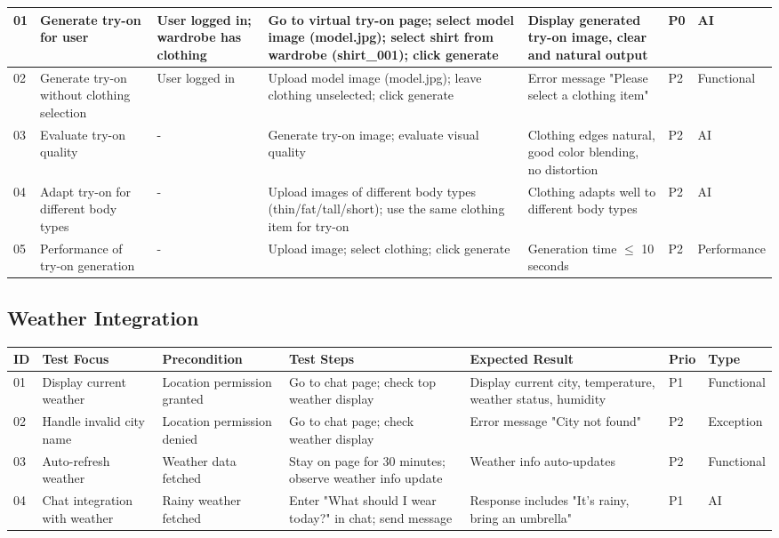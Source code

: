 \begin{appendices}
\begin{landscape}
\begin{longtable}{|p{0.8cm}|p{2.8cm}|p{2.5cm}|p{6cm}|p{5cm}|p{1.2cm}|p{1.8cm}|}
01 & Generate try-on for user & User logged in; wardrobe has clothing & Go to virtual try-on page; select model image (model.jpg); select shirt from wardrobe (shirt\_001); click generate & Display generated try-on image, clear and natural output & P0 & AI \\
\hline
02 & Generate try-on without clothing selection & User logged in & Upload model image (model.jpg); leave clothing unselected; click generate & Error message "Please select a clothing item" & P2 & Functional \\
\hline
03 & Evaluate try-on quality & - & Generate try-on image; evaluate visual quality & Clothing edges natural, good color blending, no distortion & P2 & AI \\
\hline
04 & Adapt try-on for different body types & - & Upload images of different body types (thin/fat/tall/short); use the same clothing item for try-on & Clothing adapts well to different body types & P2 & AI \\
\hline
05 & Performance of try-on generation & - & Upload image; select clothing; click generate & Generation time $\leq$ 10 seconds & P2 & Performance \\
\hline
\end{longtable}
\end{landscape}

\begin{landscape}
\subsection*{Weather Integration}

\begin{longtable}{|p{0.8cm}|p{2.8cm}|p{2.5cm}|p{6cm}|p{5cm}|p{1.2cm}|p{1.8cm}|}
\hline
\textbf{ID} & \textbf{Test Focus} & \textbf{Precondition} & \textbf{Test Steps} & \textbf{Expected Result} & \textbf{Prio} & \textbf{Type} \\
\hline

01 & Display current weather & Location permission granted & Go to chat page; check top weather display & Display current city, temperature, weather status, humidity & P1 & Functional \\
\hline
02 & Handle invalid city name & Location permission denied & Go to chat page; check weather display & Error message "City not found" & P2 & Exception \\
\hline
03 & Auto-refresh weather & Weather data fetched & Stay on page for 30 minutes; observe weather info update & Weather info auto-updates & P2 & Functional \\
\hline
04 & Chat integration with weather & Rainy weather fetched & Enter "What should I wear today?" in chat; send message & Response includes "It's rainy, bring an umbrella" & P1 & AI \\
\hline
\end{longtable}
\end{landscape}


\end{appendices}
